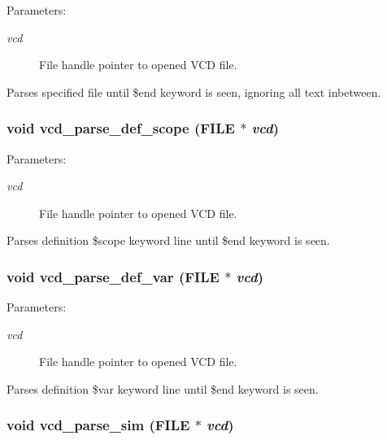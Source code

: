 \begin{Desc}
\item[Parameters: ]\par
\begin{description}
\item[{\em 
vcd}]File handle pointer to opened VCD file.\end{description}
\end{Desc}
Parses specified file until \$end keyword is seen, ignoring all text inbetween. 
\subsubsection{\setlength{\rightskip}{0pt plus 5cm}void vcd\_\-parse\_\-def\_\-scope (FILE $\ast$ {\em vcd})}\label{vcd_8c_a2}


\begin{Desc}
\item[Parameters: ]\par
\begin{description}
\item[{\em 
vcd}]File handle pointer to opened VCD file.\end{description}
\end{Desc}
Parses definition \$scope keyword line until \$end keyword is seen. 
\subsubsection{\setlength{\rightskip}{0pt plus 5cm}void vcd\_\-parse\_\-def\_\-var (FILE $\ast$ {\em vcd})}\label{vcd_8c_a1}


\begin{Desc}
\item[Parameters: ]\par
\begin{description}
\item[{\em 
vcd}]File handle pointer to opened VCD file.\end{description}
\end{Desc}
Parses definition \$var keyword line until \$end keyword is seen. 
\subsubsection{\setlength{\rightskip}{0pt plus 5cm}void vcd\_\-parse\_\-sim (FILE $\ast$ {\em vcd})}\label{vcd_8c_a5}


